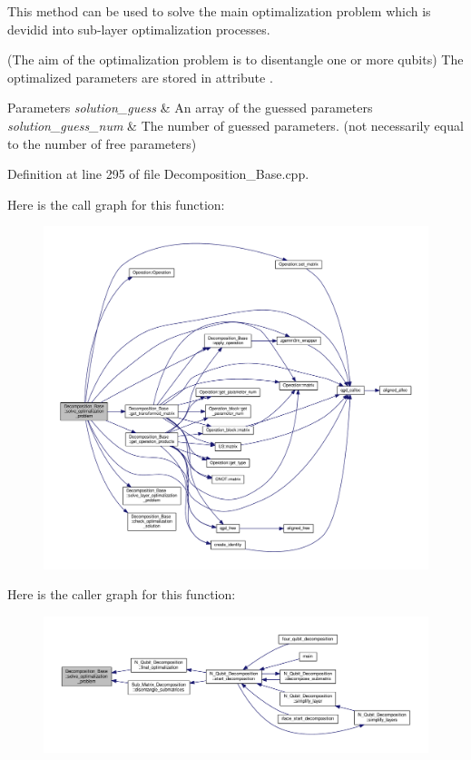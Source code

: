 This method can be used to solve the main optimalization problem which is devidid into sub-\/layer optimalization processes. 

(The aim of the optimalization problem is to disentangle one or more qubits) The optimalized parameters are stored in attribute . 
\begin{DoxyParams}{Parameters}
{\em solution\+\_\+guess} & An array of the guessed parameters \\
\hline
{\em solution\+\_\+guess\+\_\+num} & The number of guessed parameters. (not necessarily equal to the number of free parameters) \\
\hline
\end{DoxyParams}


Definition at line 295 of file Decomposition\+\_\+\+Base.\+cpp.



Here is the call graph for this function\+:
\nopagebreak
\begin{figure}[H]
\begin{center}
\leavevmode
\includegraphics[width=350pt]{class_decomposition___base_ae21ecd8c5016a6ec942330247e8cdebc_cgraph}
\end{center}
\end{figure}




Here is the caller graph for this function\+:
\nopagebreak
\begin{figure}[H]
\begin{center}
\leavevmode
\includegraphics[width=350pt]{class_decomposition___base_ae21ecd8c5016a6ec942330247e8cdebc_icgraph}
\end{center}
\end{figure}



